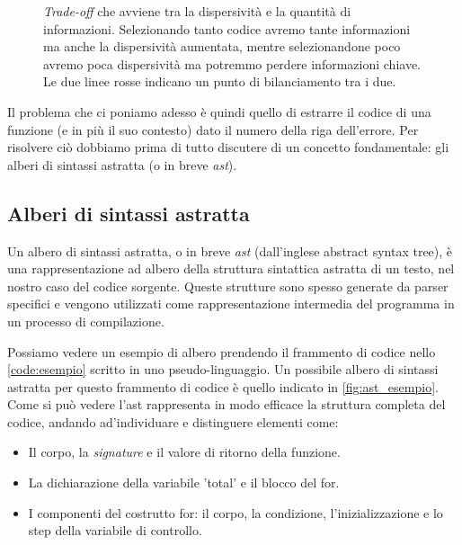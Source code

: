 \begin{figure}
  \centering
  \caption{\textit{Trade-off} che avviene tra la dispersività e la quantità di informazioni. Selezionando tanto codice avremo tante informazioni ma anche la dispersività aumentata, mentre selezionandone poco avremo poca dispersività ma potremmo perdere informazioni chiave.
    Le due linee rosse indicano un punto di bilanciamento tra i due.
  }
  \label{fig:trade_off}
\end{figure}

Il problema che ci poniamo adesso è quindi quello di estrarre il codice di una funzione (e in più il suo contesto) dato il numero della riga dell'errore. 
Per risolvere ciò dobbiamo prima di tutto discutere di un concetto fondamentale: gli alberi di sintassi astratta (o in breve \textit{ast}).

\pagebreak

\subsection{Alberi di sintassi astratta}
Un albero di sintassi astratta, o in breve \textit{ast} (dall'inglese abstract syntax tree), è una rappresentazione ad albero della struttura sintattica astratta di un testo, nel nostro caso del codice sorgente.
Queste strutture sono spesso generate da parser specifici e vengono utilizzati come rappresentazione intermedia del programma in un processo di compilazione.

Possiamo vedere un esempio di albero prendendo il frammento di codice nello \autoref{code:esempio} scritto in uno pseudo-linguaggio.
Un possibile albero di sintassi astratta per questo frammento di codice è quello indicato in \autoref{fig:ast_esempio}.
Come si può vedere l'ast rappresenta in modo efficace la struttura completa del codice, andando ad'individuare e distinguere elementi come:
  \begin{itemize}
    \item Il corpo, la \textit{signature} e il valore di ritorno della funzione. 
    \item La dichiarazione della variabile 'total' e il blocco del for.
    \item I componenti del costrutto for: il corpo, la condizione, l'inizializzazione e lo step della variabile di controllo.
  \end{itemize}

